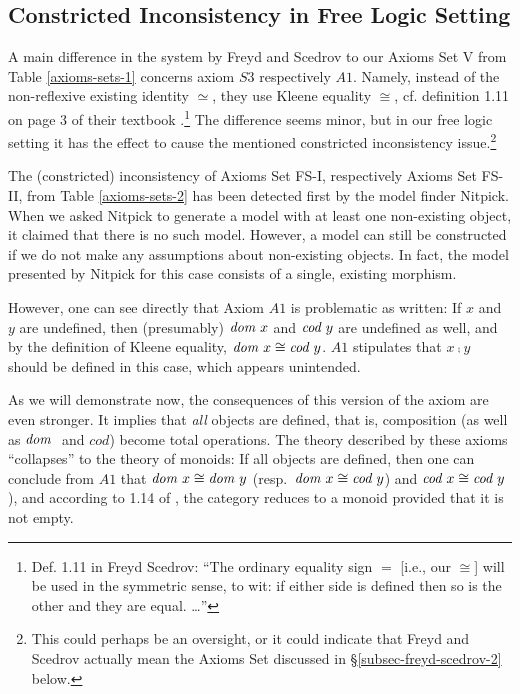  \subsection{Constricted Inconsistency in Free Logic
   Setting} \label{subsec-freyd-scedrov-1} A main difference in the
 system by Freyd and Scedrov to our Axioms Set V from Table
 \ref{axioms-sets-1} concerns axiom $S3$ respectively $A1$. Namely,
 instead of the non-reflexive existing identity $\simeq$, they use
 Kleene equality $\cong$, cf. definition 1.11 on page 3 of their textbook
 \cite{FreydScedrov90}.\footnote{Def. 1.11 in Freyd Scedrov: ``The
   ordinary equality sign $=$ [i.e., our $\cong$] will be used in the
   symmetric sense, to wit: if either side is defined then so is the
   other and they are equal. \ldots''} The difference seems minor, but
 in our free logic setting it has the effect to cause the mentioned
 constricted inconsistency issue.\footnote{This could perhaps be an
   oversight, or it could indicate that Freyd and Scedrov actually
   mean the Axioms Set discussed in \S\ref{subsec-freyd-scedrov-2}
   below.%
 }

  The (constricted) inconsistency of Axioms Set FS-I, respectively
  Axioms Set FS-II, from Table \ref{axioms-sets-2} has been 
  detected first by the model finder Nitpick. When we asked Nitpick to
  generate a model with at least one non-existing object, it claimed
  that there is no such model. However, a model can still be
  constructed if we do not make any assumptions about non-existing
  objects. In fact, the model presented by Nitpick for this case
  consists of a single, existing morphism.

However, one can see directly that Axiom $A1$ is problematic
as written: If $x$ and $y$ are undefined, then
(presumably) $\textit{dom \/} x$ and $\textit{cod \/} y$ are undefined as
well, and by the definition of Kleene equality, $\textit{dom \/} x \cong \textit{cod \/}
  y$. $A1$ stipulates that $x \comp y$ should be defined in
this case, which appears unintended.

As we will demonstrate now, the consequences of this version of the axiom are
even stronger. It implies that \emph{all} objects are defined,
that is, composition (as well as $\textit{dom \/}$ and $cod$) become total operations.
The theory described by these axioms ``collapses'' to the theory of
monoids: If all objects are defined, then one can conclude from $A1$ that 
$\textit{dom \/} x \cong \textit{dom \/} y$ (resp.~$\textit{dom \/} x \cong \textit{cod \/} y$) and $\textit{cod \/} x \cong \textit{cod \/} y$), 
and according to 1.14 of \cite{FreydScedrov90}, 
the category reduces to a monoid provided that it is not empty.


